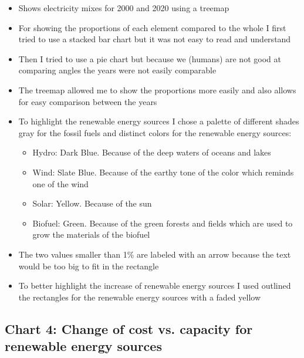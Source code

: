 \documentclass{article}
\begin{document}
\begin{itemize}
    \item Shows electricity mixes for 2000 and 2020 using a treemap
    \item For showing the proportions of each element compared to the whole I first tried to use a stacked bar chart but it was not easy to read and understand
    \item Then I tried to use a pie chart but because we (humans) are not good at comparing angles the years were not easily comparable
    \item The treemap allowed me to show the proportions more easily and also allows for easy comparison between the years
    \item To highlight the renewable energy sources I chose a palette of different shades gray for the fossil fuels and distinct colors for the renewable energy sources:
    \begin{itemize}
        \item Hydro: Dark Blue. Because of the deep waters of oceans and lakes
        \item Wind: Slate Blue. Because of the earthy tone of the color which reminds one of the wind
        \item Solar: Yellow. Because of the sun
        \item Biofuel: Green. Because of the green forests and fields which are used to grow the materials of the biofuel
    \end{itemize}
    \item The two values smaller than 1\% are labeled with an arrow because the text would be too big to fit in the rectangle
    \item To better highlight the increase of renewable energy sources I used outlined the rectangles for the renewable energy sources with a faded yellow
\end{itemize}

\subsection{Chart 4: Change of cost vs. capacity for renewable energy sources}
\end{document}
